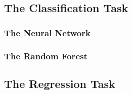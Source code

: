 
\subsection{The Classification Task}

\subsubsection{The Neural Network}

\subsubsection{The Random Forest}



\subsection{The Regression Task}
